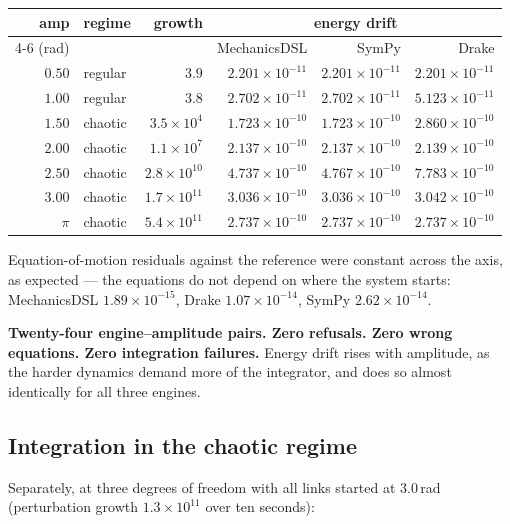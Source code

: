 \documentclass[11pt,a4paper]{article}
\begin{document}
\begin{center}
\begin{tabular}{@{}rlrrrr@{}}
\toprule
\textbf{amp} & \textbf{regime} & \textbf{growth} & \multicolumn{3}{c}{\textbf{energy drift}} \\
\cmidrule(l){4-6}
(rad) & & & MechanicsDSL & SymPy & Drake \\
\midrule
$0.50$ & regular & $3.9$              & $2.201\!\times\!10^{-11}$ & $2.201\!\times\!10^{-11}$ & $2.201\!\times\!10^{-11}$ \\
$1.00$ & regular & $3.8$              & $2.702\!\times\!10^{-11}$ & $2.702\!\times\!10^{-11}$ & $5.123\!\times\!10^{-11}$ \\
$1.50$ & chaotic & $3.5\times10^{4}$  & $1.723\!\times\!10^{-10}$ & $1.723\!\times\!10^{-10}$ & $2.860\!\times\!10^{-10}$ \\
$2.00$ & chaotic & $1.1\times10^{7}$  & $2.137\!\times\!10^{-10}$ & $2.137\!\times\!10^{-10}$ & $2.139\!\times\!10^{-10}$ \\
$2.50$ & chaotic & $2.8\times10^{10}$ & $4.737\!\times\!10^{-10}$ & $4.767\!\times\!10^{-10}$ & $7.783\!\times\!10^{-10}$ \\
$3.00$ & chaotic & $1.7\times10^{11}$ & $3.036\!\times\!10^{-10}$ & $3.036\!\times\!10^{-10}$ & $3.042\!\times\!10^{-10}$ \\
$\pi$  & chaotic & $5.4\times10^{11}$ & $2.737\!\times\!10^{-10}$ & $2.737\!\times\!10^{-10}$ & $2.737\!\times\!10^{-10}$ \\
\bottomrule
\end{tabular}
\end{center}

\noindent Equation-of-motion residuals against the reference were constant
across the axis, as expected --- the equations do not depend on where the
system starts: MechanicsDSL $1.89\times10^{-15}$, Drake $1.07\times10^{-14}$,
SymPy $2.62\times10^{-14}$.

\medskip
\noindent\textbf{Twenty-four engine--amplitude pairs. Zero refusals. Zero wrong
equations. Zero integration failures.} Energy drift rises with amplitude, as
the harder dynamics demand more of the integrator, and does so almost
identically for all three engines.

\subsection{Integration in the chaotic regime}

Separately, at three degrees of freedom with all links started at $3.0$\,rad
(perturbation growth $1.3\times10^{11}$ over ten seconds):
\end{document}
